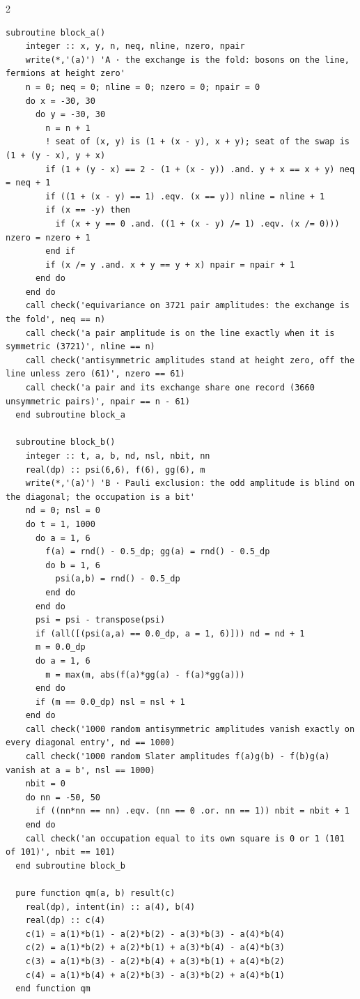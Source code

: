 \documentclass[10pt]{article}
\begin{document}
\begin{multicols}{2}
\begin{Verbatim}[fontsize=\fontsize{6.0}{6.9}\selectfont,breaklines,breakanywhere,breaksymbolleft={}]
  subroutine block_a()
    integer :: x, y, n, neq, nline, nzero, npair
    write(*,'(a)') 'A · the exchange is the fold: bosons on the line, fermions at height zero'
    n = 0; neq = 0; nline = 0; nzero = 0; npair = 0
    do x = -30, 30
      do y = -30, 30
        n = n + 1
        ! seat of (x, y) is (1 + (x - y), x + y); seat of the swap is (1 + (y - x), y + x)
        if (1 + (y - x) == 2 - (1 + (x - y)) .and. y + x == x + y) neq = neq + 1
        if ((1 + (x - y) == 1) .eqv. (x == y)) nline = nline + 1
        if (x == -y) then
          if (x + y == 0 .and. ((1 + (x - y) /= 1) .eqv. (x /= 0))) nzero = nzero + 1
        end if
        if (x /= y .and. x + y == y + x) npair = npair + 1
      end do
    end do
    call check('equivariance on 3721 pair amplitudes: the exchange is the fold', neq == n)
    call check('a pair amplitude is on the line exactly when it is symmetric (3721)', nline == n)
    call check('antisymmetric amplitudes stand at height zero, off the line unless zero (61)', nzero == 61)
    call check('a pair and its exchange share one record (3660 unsymmetric pairs)', npair == n - 61)
  end subroutine block_a

  subroutine block_b()
    integer :: t, a, b, nd, nsl, nbit, nn
    real(dp) :: psi(6,6), f(6), gg(6), m
    write(*,'(a)') 'B · Pauli exclusion: the odd amplitude is blind on the diagonal; the occupation is a bit'
    nd = 0; nsl = 0
    do t = 1, 1000
      do a = 1, 6
        f(a) = rnd() - 0.5_dp; gg(a) = rnd() - 0.5_dp
        do b = 1, 6
          psi(a,b) = rnd() - 0.5_dp
        end do
      end do
      psi = psi - transpose(psi)
      if (all([(psi(a,a) == 0.0_dp, a = 1, 6)])) nd = nd + 1
      m = 0.0_dp
      do a = 1, 6
        m = max(m, abs(f(a)*gg(a) - f(a)*gg(a)))
      end do
      if (m == 0.0_dp) nsl = nsl + 1
    end do
    call check('1000 random antisymmetric amplitudes vanish exactly on every diagonal entry', nd == 1000)
    call check('1000 random Slater amplitudes f(a)g(b) - f(b)g(a) vanish at a = b', nsl == 1000)
    nbit = 0
    do nn = -50, 50
      if ((nn*nn == nn) .eqv. (nn == 0 .or. nn == 1)) nbit = nbit + 1
    end do
    call check('an occupation equal to its own square is 0 or 1 (101 of 101)', nbit == 101)
  end subroutine block_b

  pure function qm(a, b) result(c)
    real(dp), intent(in) :: a(4), b(4)
    real(dp) :: c(4)
    c(1) = a(1)*b(1) - a(2)*b(2) - a(3)*b(3) - a(4)*b(4)
    c(2) = a(1)*b(2) + a(2)*b(1) + a(3)*b(4) - a(4)*b(3)
    c(3) = a(1)*b(3) - a(2)*b(4) + a(3)*b(1) + a(4)*b(2)
    c(4) = a(1)*b(4) + a(2)*b(3) - a(3)*b(2) + a(4)*b(1)
  end function qm


\end{Verbatim}
\end{multicols}
\end{document}
